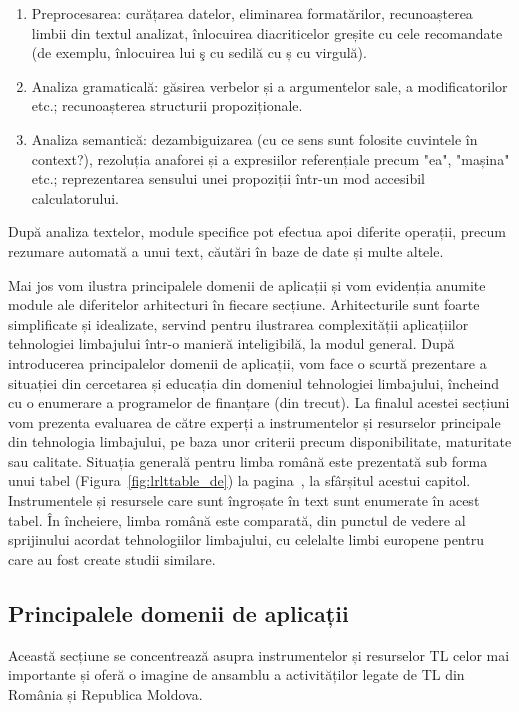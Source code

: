 \begin{multicols}{2}
\begin{enumerate}
\item Preprocesarea: curățarea datelor, eliminarea formatărilor, recunoașterea limbii din textul analizat, înlocuirea diacriticelor greșite cu cele recomandate (de exemplu, înlocuirea lui ş cu sedilă cu ș cu virgulă).
\item Analiza gramaticală: găsirea verbelor și a argumentelor sale, a modificatorilor etc.; recunoașterea structurii propoziționale.
\item Analiza semantică: dezambiguizarea (cu ce sens sunt folosite cuvintele în context?), rezoluția anaforei și a expresiilor referențiale precum "ea", "mașina" etc.; reprezentarea sensului unei propoziții într-un mod accesibil calculatorului.
\end{enumerate}
După analiza textelor, module specifice pot efectua apoi diferite operații, precum rezumare automată a unui text, căutări în baze de date și multe altele. 

Mai jos vom ilustra principalele domenii de aplicații și vom evidenția anumite module ale diferitelor arhitecturi în fiecare secțiune. Arhitecturile sunt foarte simplificate și idealizate, servind pentru ilustrarea complexității aplicațiilor tehnologiei limbajului într-o manieră inteligibilă, la modul general. După introducerea principalelor domenii de aplicații, vom face o scurtă prezentare a situației din cercetarea și educația din domeniul tehnologiei limbajului, încheind cu o enumerare a programelor de finanțare (din trecut). La finalul acestei secțiuni vom prezenta evaluarea de către experți a instrumentelor și resurselor principale din tehnologia limbajului, pe baza unor criterii precum disponibilitate, maturitate sau calitate. Situația generală pentru limba română este prezentată sub forma unui tabel (Figura~\ref{fig:lrlttable_de}) la pagina~\pageref{fig:lrlttable_de}, la sfârșitul acestui capitol. Instrumentele și resursele care sunt îngroșate în text sunt enumerate în acest tabel. În încheiere, limba română este comparată, din punctul de vedere al sprijinului acordat tehnologiilor limbajului, cu celelalte limbi europene pentru care au fost create studii similare.

\subsection{Principalele domenii de aplicații} 

Această secțiune se concentrează asupra instrumentelor și resurselor TL celor mai importante și oferă o imagine de ansamblu a activităților legate de TL din România și Republica Moldova.

\end{multicols}
